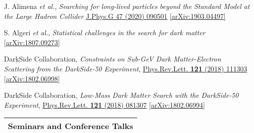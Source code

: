 \documentclass[letterpaper,11pt]{article}
\newenvironment{packed_enumerate}[1][]{
\begin{etaremune}[#1]
  \setlength{\itemsep}{3.9pt}
  \setlength{\parskip}{0pt}
  \setlength{\parsep}{0pt}}{\end{etaremune}
}
\begin{document}
\begin{packed_enumerate}[start=4]
  \item J. Alimena \emph{et al.}, \emph{Searching for long-lived particles beyond the Standard Model at the Large Hadron Collider}  \href{https://iopscience.iop.org/article/10.1088/1361-6471/ab4574}{J.Phys.G 47 (2020) 090501} \href{https://arxiv.org/abs/1903.04497}{[arXiv:1903.04497]}

  \item S. Algeri \emph{et al.}, \emph{Statistical challenges in the search for dark matter} \href{https://arxiv.org/abs/1807.09273}{[arXiv:1807.09273]}

  \item DarkSide Collaboration, \emph{Constraints on Sub-GeV Dark Matter-Electron Scattering from the DarkSide-50 Experiment}, \href{https://journals.aps.org/prl/abstract/10.1103/PhysRevLett.121.111303}{Phys.Rev.Lett. \textbf{121} (2018) 111303} \href{https://arxiv.org/abs/1802.06998}{[arXiv:1802.06998]}

  \item DarkSide Collaboration, \emph{Low-Mass Dark Matter Search with the DarkSide-50 Experiment}, \href{https://journals.aps.org/prl/abstract/10.1103/PhysRevLett.121.081307}{Phys.Rev.Lett. \textbf{121} (2018) 081307}  \href{https://arxiv.org/abs/1802.06994}{[arXiv:1802.06994]}
\end{packed_enumerate}
\vspace{2.0mm}



\noindent
\begin{tabular*}{\textwidth}{l@{\extracolsep{\fill}}}
\large {\sc \Large{Seminars and Conference Talks}}\\
\hline
\end{tabular*}\vspace{3.5mm}
\end{document}
